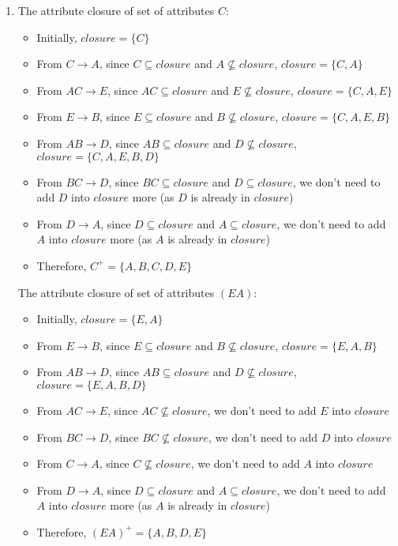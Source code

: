 \documentclass[12pt]{article}
\begin{document}
\begin{enumerate}
  \item The attribute closure of set of attributes $C$:
        \begin{itemize}
          \item Initially, $closure = \{C\}$
          \item From $C \longrightarrow A$, since $C \subseteq closure$ and $A
                \not \subseteq closure$, $closure = \{C, A\}$
          \item From $AC \longrightarrow E$, since $AC \subseteq closure$ and
                $E \not \subseteq closure$, $closure = \{C, A, E\}$
          \item From $E \longrightarrow B$, since $E \subseteq closure$ and $B
                \not \subseteq closure$, $closure = \{C, A, E ,B\}$
          \item From $AB \longrightarrow D$, since $AB \subseteq closure$ and $D
                \not \subseteq closure$, $closure = \{C, A, E, B, D\}$
          \item From $BC \longrightarrow D$, since $BC \subseteq closure$ and $D
                \subseteq closure$, we don't need to add $D$ into $closure$ more
                (as $D$ is already in $closure$)
          \item From $D \longrightarrow A$, since $D \subseteq closure$ and $A
                \subseteq closure$, we don't need to add $A$ into $closure$ more
                (as $A$ is already in $closure$)
          \item Therefore, $C^+ = \{A, B, C, D, E\}$
        \end{itemize}

        The attribute closure of set of attributes $(EA)$:
        \begin{itemize}
          \item Initially, $closure = \{E, A\}$
          \item From $E \longrightarrow B$, since $E \subseteq closure$ and $B
                \not \subseteq closure$, $closure = \{E, A, B\}$
          \item From $AB \longrightarrow D$, since $AB \subseteq closure$ and $D
                \not \subseteq closure$, $closure = \{E, A, B, D\}$
          \item From $AC \longrightarrow E$, since $AC \not \subseteq closure$,
                we don't need to add $E$ into $closure$
          \item From $BC \longrightarrow D$, since $BC \not \subseteq closure$,
                we don't need to add $D$ into $closure$
          \item From $C \longrightarrow A$, since $C \not \subseteq closure$,
                we don't need to add $A$ into $closure$
          \item From $D \longrightarrow A$, since $D \subseteq closure$ and $A
                \subseteq closure$, we don't need to add $A$ into $closure$ more
                (as $A$ is already in $closure$)
          \item Therefore, $(EA)^+ = \{A, B, D, E\}$
        \end{itemize}
  \ \\
    

\end{enumerate}
\end{document}
